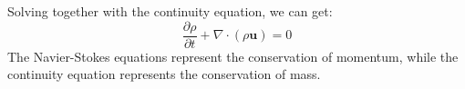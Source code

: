 \documentclass[%
 reprint,
 amsmath,amssymb,
 aps,
rmp,
]{revtex4-1}
\begin{document}
Solving together with the continuity equation, we can get:
\begin{equation}
\frac{\partial \rho}{\partial t} + \nabla\cdot(\rho\bm{u})=0
\label{eq:continueNavierStokesequation}
\end{equation}
The Navier-Stokes equations represent the conservation of momentum, while the continuity equation represents the conservation of mass.
\end{document}
